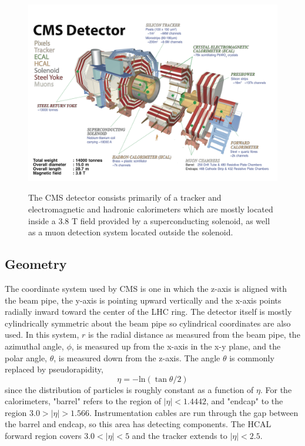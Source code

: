 \begin{figure}[tb]
\caption[The CMS Detector]{
 The CMS detector consists primarily of a tracker
  and electromagnetic and hadronic calorimeters
  which are mostly located inside a 3.8 T field provided
  by a superconducting solenoid,
  as well as a muon detection system located 
  outside the solenoid.
 }
\includegraphics[width=\textwidth]{pdfs/experiment/cms_explode.pdf}
\label{fig:cms_explode}
\end{figure}


 \subsection{Geometry} 
The coordinate system used by CMS is one in
 which the z-axis is aligned with the beam pipe,
 the y-axis is pointing upward vertically
 and the x-axis points radially inward toward the
 center of the LHC ring. 
The detector itself is mostly cylindrically symmetric
 about the beam pipe so cylindrical coordinates
 are also used.
In this system, $r$ is the radial distance
 as measured from the beam pipe, the azimuthal angle, $\phi$,
 is measured up from the x-axis in the x-y plane,
 and the polar angle, $\theta$, is measured
 down from the z-axis.
The angle $\theta$ is commonly replaced by pseudorapidity, 
\begin{equation}\label{eq:eta}
\eta = -\mathrm{ln}(\tan \theta/2)
\end{equation}
 since the distribution of particles
 is roughly constant as a function of $\eta$.
For the calorimeters, "barrel" refers to the region of $|\eta| < 1.4442$,
 and "endcap" to the region $3.0 > |\eta| > 1.566$.
Instrumentation cables are run through the
 gap between the barrel and endcap,
 so this area has detecting components. 
The HCAL forward region covers $3.0 < |\eta| < 5$ and
 the tracker extends to $|\eta| < 2.5$.

